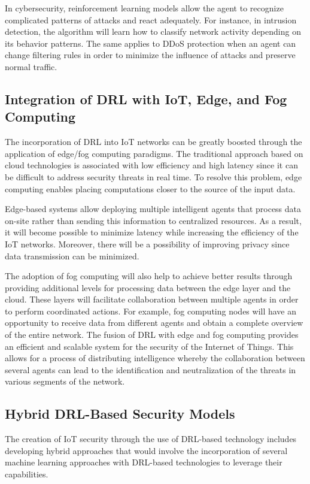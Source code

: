 \documentclass[12pt]{article}
\begin{document}
In cybersecurity, reinforcement learning models allow the agent to recognize complicated patterns of attacks and react adequately. For instance, in intrusion detection, the algorithm will learn how to classify network activity depending on its behavior patterns. The same applies to DDoS protection when an agent can change filtering rules in order to minimize the influence of attacks and preserve normal traffic.
\subsection{Integration of DRL with IoT, Edge, and Fog Computing}
The incorporation of DRL into IoT networks\cite{R} can be greatly boosted through the application of edge/fog computing paradigms. The traditional approach based on cloud technologies is associated with low efficiency and high latency since it can be difficult to address security threats in real time. To resolve this problem, edge computing enables placing computations closer to the source of the input data.

Edge-based systems allow deploying multiple intelligent agents that process data on-site rather than sending this information to centralized resources. As a result, it will become possible to minimize latency while increasing the efficiency of the IoT networks. Moreover, there will be a possibility of improving privacy since data transmission can be minimized.

The adoption of fog computing will also help to achieve better results through providing additional levels for processing data between the edge layer and the cloud. These layers will facilitate collaboration between multiple agents in order to perform coordinated actions. For example, fog computing nodes will have an opportunity to receive data from different agents and obtain a complete overview of the entire network.
The fusion of DRL with edge and fog computing provides an efficient and scalable system for the security of the Internet of Things. This allows for a process of distributing intelligence whereby the collaboration between several agents can lead to the identification and neutralization of the threats in various segments of the network.
	\subsection{Hybrid DRL-Based Security Models}
    The creation of IoT security\cite{Asad} through the use of DRL-based technology includes developing hybrid approaches that would involve the incorporation of several machine learning approaches with DRL-based technologies to leverage their capabilities.
\end{document}

